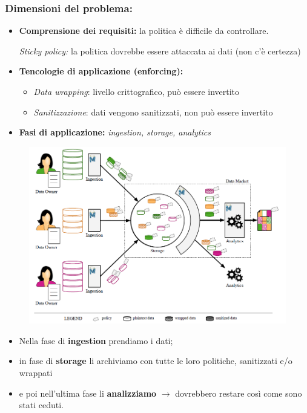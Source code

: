 \documentclass{report}
\begin{document}
\subsubsection{Dimensioni del problema:}
\begin{itemize}
    \item \textbf{Comprensione dei requisiti:} la politica è difficile da controllare. 
    
    \textit{Sticky policy:} la politica dovrebbe essere attaccata ai dati (non c'è certezza)
    \item \textbf{Tencologie di applicazione (enforcing):}
    \begin{itemize}
        \item \textit{Data wrapping}: livello crittografico, può essere invertito
        \item \textit{Sanitizzazione}: dati vengono sanitizzati, non può essere invertito
    \end{itemize}
    \item \textbf{Fasi di applicazione:} \textit{ingestion, storage, analytics}
\end{itemize}

\begin{figure}[ht]
    \centering
    \includegraphics[width=1\linewidth]{images/i bellissimi dati.png}
\end{figure}
\begin{itemize}
    \item Nella fase di \textbf{ingestion} prendiamo i dati;
    \item in fase di \textbf{storage} li archiviamo con tutte le loro politiche, sanitizzati e/o wrappati
    \item e poi nell'ultima fase li \textbf{analizziamo} $ \rightarrow$ dovrebbero restare così come sono stati ceduti.
\end{itemize}
 
\end{document}
